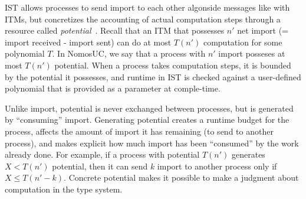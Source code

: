 IST allows processes to send import to each other algonside messages like with ITMs, but concretizes the accounting of actual computation steps through a resource called \emph{potential}~\cite{das2018work,dasnomos}.
Recall that an ITM that possesses $n'$ net import (= import received - import sent) can do at most $T(n')$ computation for some polynomial $T$.
In NomosUC, we say that a process with $n'$ import posseses at most $T(n')$ potential.
When a process takes computation steps, it is bounded by the potential it possesses, and runtime in IST is checked against a user-defined polynomial that is provided as a parameter at comple-time.

Unlike import, potential is never exchanged between processes, but is generated by ``consuming'' import.
Generating potential creates a runtime budget for the process, affects the amount of import it has remaining (to send to another process), and makes explicit how much import has been ``consumed'' by the work already done.
For example, if a process with potential $T(n')$ generates $X < T(n')$ potential, then it can send $k$ import to another process only if $X \leq T(n'-k)$.
Concrete potential makes it possible to make a judgment about computation in the type system.

